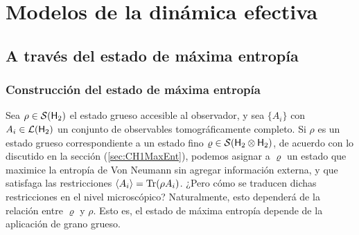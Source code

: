 \chapter{Modelos de la dinámica efectiva}

\section{A través del estado de máxima entropía}


\subsection{Construcción del estado de máxima entropía}

Sea $\rho\in\mathcal{S}({\sf H}_{2})$ el estado grueso accesible al observador, y sea $\{A_{i}\}$ con $A_{i}\in\mathcal{L}({\sf H}_{2})$ un conjunto de observables tomográficamente completo. Si $\rho$ es un estado grueso correspondiente a un estado fino $\varrho\in\mathcal{S}({\sf H}_{2}\otimes{\sf H}_{2})$, de acuerdo con lo discutido en la sección (\ref{sec:CH1MaxEnt}), podemos asignar a $\varrho$ un estado que maximice la entropía de Von Neumann sin agregar información externa, y que satisfaga las restricciones $\expval{A_{i}}=\Tr(\rho A_{i})$. ¿Pero cómo se traducen dichas restricciones en el nivel microscópico? Naturalmente, esto dependerá de la relación entre $\varrho$ y $\rho$. Esto es, el estado de máxima entropía depende de la aplicación de grano grueso.

